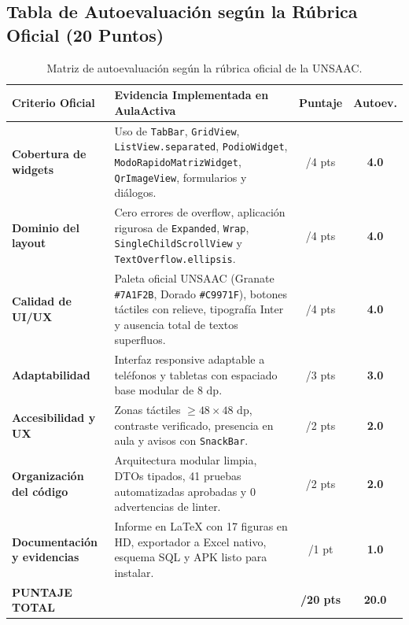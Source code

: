 \documentclass[12pt,a4paper]{article}
\begin{document}
\subsection{Tabla de Autoevaluación según la Rúbrica Oficial (20 Puntos)}

\begin{table}[H]
\centering
\begin{tabularx}{\textwidth}{p{4.2cm}Xcc}
\toprule
\textbf{Criterio Oficial} & \textbf{Evidencia Implementada en AulaActiva} & \textbf{Puntaje} & \textbf{Autoev.} \\
\midrule
\textbf{Cobertura de widgets} & Uso de \texttt{TabBar}, \texttt{GridView}, \texttt{ListView.separated}, \texttt{PodioWidget}, \texttt{ModoRapidoMatrizWidget}, \texttt{QrImageView}, formularios y diálogos. & /4 pts & \textbf{4.0} \\
\addlinespace
\textbf{Dominio del layout} & Cero errores de overflow, aplicación rigurosa de \texttt{Expanded}, \texttt{Wrap}, \texttt{SingleChildScrollView} y \texttt{TextOverflow.ellipsis}. & /4 pts & \textbf{4.0} \\
\addlinespace
\textbf{Calidad de UI/UX} & Paleta oficial UNSAAC (Granate \texttt{\#7A1F2B}, Dorado \texttt{\#C9971F}), botones táctiles con relieve, tipografía Inter y ausencia total de textos superfluos. & /4 pts & \textbf{4.0} \\
\addlinespace
\textbf{Adaptabilidad} & Interfaz responsive adaptable a teléfonos y tabletas con espaciado base modular de $8\text{ dp}$. & /3 pts & \textbf{3.0} \\
\addlinespace
\textbf{Accesibilidad y UX} & Zonas táctiles $\ge 48 \times 48\text{ dp}$, contraste verificado, presencia en aula y avisos con \texttt{SnackBar}. & /2 pts & \textbf{2.0} \\
\addlinespace
\textbf{Organización del código} & Arquitectura modular limpia, DTOs tipados, 41 pruebas automatizadas aprobadas y 0 advertencias de linter. & /2 pts & \textbf{2.0} \\
\addlinespace
\textbf{Documentación y evidencias} & Informe en LaTeX con 17 figuras en HD, exportador a Excel nativo, esquema SQL y APK listo para instalar. & /1 pt & \textbf{1.0} \\
\midrule
\textbf{PUNTAJE TOTAL} & & \textbf{/20 pts} & \textbf{20.0} \\
\bottomrule
\end{tabularx}
\caption{Matriz de autoevaluación según la rúbrica oficial de la UNSAAC.}
\end{table}
\end{document}
